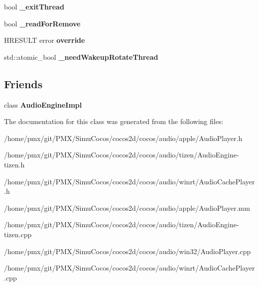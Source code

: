 \begin{DoxyCompactItemize}
bool {\bfseries \+\_\+exit\+Thread}
\item 
\mbox{\label{classexperimental_1_1AudioPlayer_a906bf423078f766fef8939b9c0a62e27}} 
bool {\bfseries \+\_\+read\+For\+Remove}
\item 
\mbox{\label{classexperimental_1_1AudioPlayer_ab69703f7fdbf5c226e0999381f8a3fb2}} 
H\+R\+E\+S\+U\+LT error {\bfseries override}
\item 
\mbox{\label{classexperimental_1_1AudioPlayer_a8cffc159c9e7f65c5d820dceeb58f2bc}} 
std\+::atomic\+\_\+bool {\bfseries \+\_\+need\+Wakeup\+Rotate\+Thread}
\end{DoxyCompactItemize}
\subsection*{Friends}
\begin{DoxyCompactItemize}
\item 
\mbox{\label{classexperimental_1_1AudioPlayer_a8e0222d6e9b81346186667563adf95a7}} 
class {\bfseries Audio\+Engine\+Impl}
\end{DoxyCompactItemize}


The documentation for this class was generated from the following files\+:\begin{DoxyCompactItemize}
\item 
/home/pmx/git/\+P\+M\+X/\+Simu\+Cocos/cocos2d/cocos/audio/apple/Audio\+Player.\+h\item 
/home/pmx/git/\+P\+M\+X/\+Simu\+Cocos/cocos2d/cocos/audio/tizen/Audio\+Engine-\/tizen.\+h\item 
/home/pmx/git/\+P\+M\+X/\+Simu\+Cocos/cocos2d/cocos/audio/winrt/Audio\+Cache\+Player.\+h\item 
/home/pmx/git/\+P\+M\+X/\+Simu\+Cocos/cocos2d/cocos/audio/apple/Audio\+Player.\+mm\item 
/home/pmx/git/\+P\+M\+X/\+Simu\+Cocos/cocos2d/cocos/audio/tizen/Audio\+Engine-\/tizen.\+cpp\item 
/home/pmx/git/\+P\+M\+X/\+Simu\+Cocos/cocos2d/cocos/audio/win32/Audio\+Player.\+cpp\item 
/home/pmx/git/\+P\+M\+X/\+Simu\+Cocos/cocos2d/cocos/audio/winrt/Audio\+Cache\+Player.\+cpp\end{DoxyCompactItemize}

